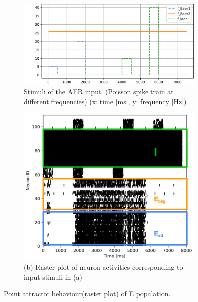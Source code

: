 \begin{figure}
	\begin{subfigure}{\textwidth}
		\centering
		\includegraphics[page=1, width=0.95\columnwidth]{./img/behavior/input_stimuli.pdf}
		\caption{Stimuli of the AER input. (Poisson spike train at different frequencies) (x: time [ms], y: frequency [Hz])}
		\label{fig:spike_input}
	\end{subfigure}
	\begin{subfigure}{\textwidth}
		\centering
		\includegraphics[width=\columnwidth]{./img/behavior/fr_holder.pdf}
		\caption{(b) Raster plot of neuron activities corresponding to input stimuli in (a)}
		\label{fig:neuron_state}
	\end{subfigure}
	\caption{Point attractor behaviour(raster plot) of E population.}
	\label{fig:behavior}
\end{figure}

